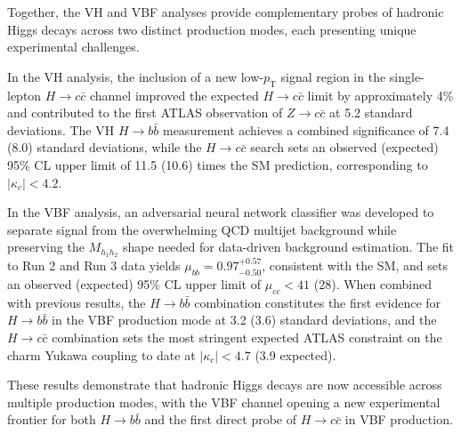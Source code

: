 Together, the VH and VBF analyses provide complementary probes of hadronic Higgs decays across two distinct production modes, each presenting unique experimental challenges.

In the VH analysis, the inclusion of a new low-$p_\mathrm{T}$ signal region in the single-lepton $H \rightarrow c\bar{c}$ channel improved the expected $H \rightarrow c\bar{c}$ limit by approximately 4\% and contributed to the first ATLAS observation of $Z \rightarrow c\bar{c}$ at 5.2 standard deviations.
The VH $H \rightarrow b\bar{b}$ measurement achieves a combined significance of 7.4 (8.0) standard deviations, while the $H \rightarrow c\bar{c}$ search sets an observed (expected) 95\% CL upper limit of 11.5 (10.6) times the SM prediction, corresponding to $|\kappa_c| < 4.2$.

In the VBF analysis, an adversarial neural network classifier was developed to separate signal from the overwhelming QCD multijet background while preserving the $M_{h_1 h_2}$ shape needed for data-driven background estimation.
The fit to Run 2 and Run 3 data yields $\mu_{bb} = 0.97^{+0.57}_{-0.50}$, consistent with the SM, and sets an observed (expected) 95\% CL upper limit of $\mu_{cc} < 41$ (28).
When combined with previous results, the $H \rightarrow b\bar{b}$ combination constitutes the first evidence for $H \rightarrow b\bar{b}$ in the VBF production mode at 3.2 (3.6) standard deviations, and the $H \rightarrow c\bar{c}$ combination sets the most stringent expected ATLAS constraint on the charm Yukawa coupling to date at $|\kappa_c| < 4.7$ (3.9 expected).

These results demonstrate that hadronic Higgs decays are now accessible across multiple production modes, with the VBF channel opening a new experimental frontier for both $H \rightarrow b\bar{b}$ and the first direct probe of $H \rightarrow c\bar{c}$ in VBF production.



